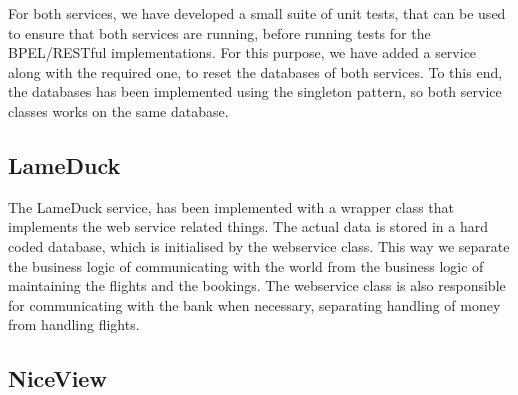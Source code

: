 For both services, we have developed a small suite of unit tests, that can be used to ensure that both services are running, before running tests for the BPEL/RESTful implementations. For this purpose, we have added a service along with the required one, to reset the databases of both services. To this end, the databases has been implemented using the singleton pattern, so both service classes works on the same database.


\subsection{LameDuck}
The LameDuck service, has been implemented with a wrapper class that implements the web service related things. The actual data is stored in a hard coded database, which is initialised by the webservice class. This way we separate the business logic of communicating with the world from the business logic of maintaining the flights and the bookings. The webservice class is also responsible for communicating with the bank when necessary, separating handling of money from handling flights.




\subsection{NiceView}


